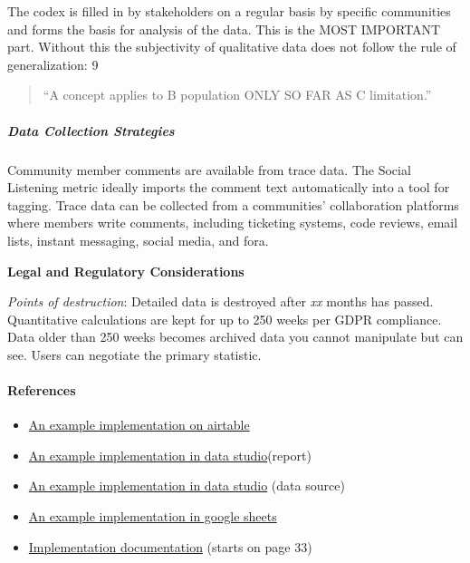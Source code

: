 The codex is filled in by stakeholders on a regular basis by specific
communities and forms the basis for analysis of the data. This is the
MOST IMPORTANT part. Without this the subjectivity of qualitative data
does not follow the rule of generalization: 9

\begin{quote}
``A concept applies to B population ONLY SO FAR AS C limitation.''
\end{quote}

\hypertarget{data-collection-strategies}{%
\subparagraph{Data Collection
Strategies}\label{data-collection-strategies}}

Community member comments are available from trace data. The Social
Listening metric ideally imports the comment text automatically into a
tool for tagging. Trace data can be collected from a communities'
collaboration platforms where members write comments, including
ticketing systems, code reviews, email lists, instant messaging, social
media, and fora.

\textbf{Legal and Regulatory Considerations}

\emph{Points of destruction}: Detailed data is destroyed after \emph{xx}
months has passed. Quantitative calculations are kept for up to 250
weeks per GDPR compliance. Data older than 250 weeks becomes archived
data you cannot manipulate but can see. Users can negotiate the primary
statistic.

\hypertarget{references}{%
\paragraph{References}\label{references}}

\begin{itemize}
\tightlist
\item
  \href{https://airtable.com/invite/l?inviteId=inv8u49VVMtQTrfFU\&inviteToken=c49b1ed3759c5cd736901fd81c9f460f86e8e9f462703c4f85a3bdd7250ca5a7}{An
  example implementation on airtable}
\item
  \href{https://datastudio.google.com/open/1X9UdQz8FtHHmjMBpjba3pFqE55lNpwg5}{An
  example implementation in data studio}(report)
\item
  \href{https://datastudio.google.com/open/1Z4EJ03898lZxm2NZVULaEoLS0bYqL79A}{An
  example implementation in data studio} (data source)
\item
  \href{https://drive.google.com/open?id=1zi3JE0bwfEdRdc-wQEZn8GaB7sE8IvxeSeqvVywKnXw}{An
  example implementation in google sheets}
\item
  \href{https://docs.google.com/document/d/1RlAedRBQbhq0oYMCB3VqdawOCZE2XT5R3teydjBZODM/edit\#heading=h.8hyunaadfriq}{Implementation
  documentation} (starts on page 33)
\end{itemize}

